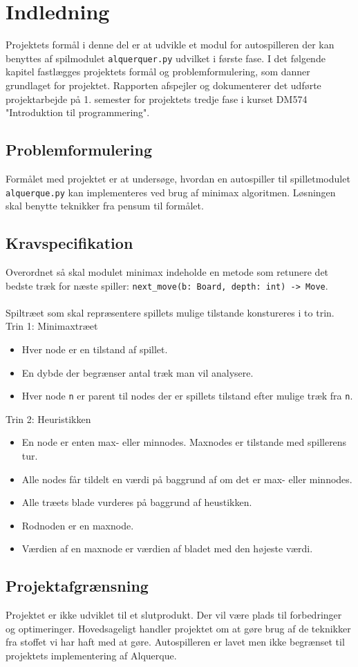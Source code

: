 \section{Indledning}
Projektets formål i denne del er at udvikle et modul for autospilleren der kan benyttes af spilmodulet \texttt{alquerquer.py} 
udvilket i første fase. I det følgende kapitel fastlægges projektets formål og problemformulering,
som danner grundlaget for projektet. Rapporten afspejler og dokumenterer det udførte projektarbejde på 1. semester for 
projektets tredje fase i kurset DM574 "Introduktion til programmering".

\subsection{Problemformulering}
Formålet med projektet er at undersøge, hvordan en autospiller til spilletmodulet \texttt{alquerque.py} kan implementeres
ved brug af minimax algoritmen. Løsningen skal benytte teknikker fra pensum til formålet.

\subsection{Kravspecifikation}
Overordnet så skal modulet minimax indeholde en metode som retunere det bedste træk for næste spiller: 
\texttt{next\_move(b: Board, depth: int) -> Move}. \\
\\
Spiltræet som skal repræsentere spillets mulige tilstande konstureres i to trin.
\bigbreak
Trin 1: Minimaxtræet
\begin{itemize}
    \item Hver node er en tilstand af spillet.
    \item En dybde der begrænser antal træk man vil analysere.
    \item Hver node \texttt{n} er parent til nodes der er spillets tilstand efter mulige træk fra \texttt{n}.
\end{itemize}
\bigbreak
Trin 2: Heuristikken
\begin{itemize}
    \item En node er enten max- eller minnodes. Maxnodes er tilstande med spillerens tur.
    \item Alle nodes får tildelt en værdi på baggrund af om det er max- eller minnodes.
    \item Alle træets blade vurderes på baggrund af heustikken.
    \item Rodnoden er en maxnode.
    \item Værdien af en maxnode er værdien af bladet med den højeste værdi.
\end{itemize}

\subsection{Projektafgrænsning}
Projektet er ikke udviklet til et slutprodukt. Der vil være plads til forbedringer 
og optimeringer.
Hovedsageligt handler projektet om at gøre brug af de teknikker fra stoffet vi har haft med at gøre.
Autospilleren er lavet men ikke begrænset til projektets implementering af Alquerque.